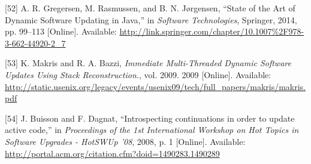 \documentclass[12pt,a4paper,oneside,openright]{book}
\begin{document}
{
{[}52{]} A. R. Gregersen, M. Rasmussen, and B. N. Jørgensen, ``State of
the Art of Dynamic Software Updating in Java,'' in \emph{Software
Technologies}, Springer, 2014, pp. 99--113 {[}Online{]}. Available:
\url{http://link.springer.com/chapter/10.1007\%2F978-3-662-44920-2_7}

{[}53{]} K. Makris and R. A. Bazzi, \emph{Immediate Multi-Threaded
Dynamic Software Updates Using Stack Reconstruction.}, vol. 2009. 2009
{[}Online{]}. Available:
\url{http://static.usenix.org/legacy/events/usenix09/tech/full_papers/makris/makris.pdf}

{[}54{]} J. Buisson and F. Dagnat, ``Introspecting continuations in
order to update active code,'' in \emph{Proceedings of the 1st
International Workshop on Hot Topics in Software Upgrades - HotSWUp
'08}, 2008, p. 1 {[}Online{]}. Available:
\url{http://portal.acm.org/citation.cfm?doid=1490283.1490289}
}
\end{document}
